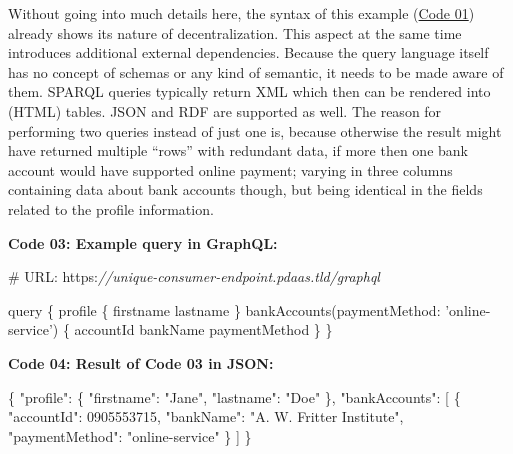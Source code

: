 \documentclass[12pt,english,a4paper,titlepage,cleardoublepage=empty,dottedtoc]{report}
\newenvironment{Shaded}{}{}
\newcommand{\DataTypeTok}[1]{\textcolor[rgb]{0.56,0.13,0.00}{{#1}}}
\newcommand{\DecValTok}[1]{\textcolor[rgb]{0.25,0.63,0.44}{{#1}}}
\newcommand{\StringTok}[1]{\textcolor[rgb]{0.25,0.44,0.63}{{#1}}}
\newcommand{\CommentTok}[1]{\textcolor[rgb]{0.38,0.63,0.69}{\textit{{#1}}}}
\newcommand{\OtherTok}[1]{\textcolor[rgb]{0.00,0.44,0.13}{{#1}}}
\newcommand{\FunctionTok}[1]{\textcolor[rgb]{0.02,0.16,0.49}{{#1}}}
\newcommand{\OperatorTok}[1]{\textcolor[rgb]{0.40,0.40,0.40}{{#1}}}
\newcommand{\AttributeTok}[1]{\textcolor[rgb]{0.49,0.56,0.16}{{#1}}}
\newcommand{\NormalTok}[1]{{#1}}
\begin{document}
Without going into much details here, the syntax of this example
(\protect\hyperlink{code-01_sparql-query}{Code 01}) already shows its
nature of decentralization. This aspect at the same time introduces
additional external dependencies. Because the query language itself has
no concept of schemas or any kind of semantic, it needs to be made aware
of them. SPARQL queries typically return XML which then can be rendered
into (HTML) tables. JSON and RDF are supported as well. The reason for
performing two queries instead of just one is, because otherwise the
result might have returned multiple ``rows'' with redundant data, if
more then one bank account would have supported online payment; varying
in three columns containing data about bank accounts though, but being
identical in the fields related to the profile information.

\textbf{\protect\hypertarget{code-03_graphql-query}{}{Code 03: Example
query in GraphQL}:}

\begin{Shaded}
\begin{Highlighting}[]
\NormalTok{# URL}\OperatorTok{:} \NormalTok{https}\OperatorTok{:}\CommentTok{//unique-consumer-endpoint.pdaas.tld/graphql}

\NormalTok{query }\OperatorTok{\{}
    \NormalTok{profile }\OperatorTok{\{}
        \NormalTok{firstname}
        \NormalTok{lastname}
    \OperatorTok{\}}
    \AttributeTok{bankAccounts}\NormalTok{(}\DataTypeTok{paymentMethod}\OperatorTok{:} \StringTok{'online-service'}\NormalTok{) }\OperatorTok{\{}
        \NormalTok{accountId}
        \NormalTok{bankName}
        \NormalTok{paymentMethod}
    \OperatorTok{\}}
\OperatorTok{\}}
\end{Highlighting}
\end{Shaded}

\textbf{\protect\hypertarget{code-04_graphql-query-result}{}{Code 04:
Result of Code 03 in JSON}:}

\begin{Shaded}
\begin{Highlighting}[]
\FunctionTok{\{}
    \DataTypeTok{"profile"}\FunctionTok{:} \FunctionTok{\{}
        \DataTypeTok{"firstname"}\FunctionTok{:} \StringTok{"Jane"}\FunctionTok{,} 
        \DataTypeTok{"lastname"}\FunctionTok{:} \StringTok{"Doe"}
    \FunctionTok{\},}
    \DataTypeTok{"bankAccounts"}\FunctionTok{:} \OtherTok{[}
        \FunctionTok{\{}
            \DataTypeTok{"accountId"}\FunctionTok{:} \DecValTok{0905553715}\FunctionTok{,}
            \DataTypeTok{"bankName"}\FunctionTok{:} \StringTok{"A. W. Fritter Institute"}\FunctionTok{,}
            \DataTypeTok{"paymentMethod"}\FunctionTok{:} \StringTok{"online-service"}
        \FunctionTok{\}}
    \OtherTok{]}
\FunctionTok{\}}
\end{Highlighting}
\end{Shaded}
\end{document}
